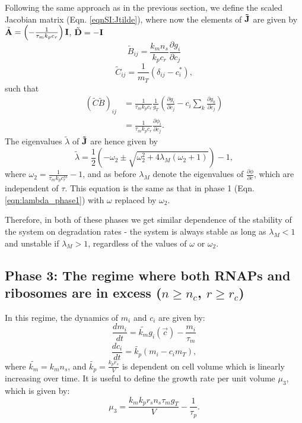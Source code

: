 \documentclass[10pt]{article}
\begin{document}
Following the same approach as in the previous section, we define the scaled Jacobian matrix (Eqn. \ref{eqnSI:Jtilde}), where now the elements of $\bf{\tilde{J}}$ are given by $\tilde{\textbf{A}} = \left(-\frac{1}{\tau_m k_p c_r}\right) \bf{I}$, $\tilde{\bf{D}} = -\mathbf{I}$
\begin{equation}
    \tilde{B}_{ij} = \frac{k_m n_s}{k_p c_r} \frac{\partial g_i}{\partial c_j}
\end{equation}
\begin{equation}
    \tilde{C}_{ij} = \frac{1}{m_T} (\delta_{ij} - c_i^*),
\end{equation}
such that
\begin{equation}
\begin{split}
    (\tilde{C}\tilde{B})_{ij} &= \frac{1}{\tau_m k_p c_r} \frac{1}{g_T} \left(\frac{\partial g_i}{\partial c_j} - c_i \sum_k \frac{\partial g_k}{\partial c_j} \right) \\
    &= \frac{1}{\tau_m k_p c_r} \frac{\partial \phi_i}{\partial c_j}.
\end{split}
\end{equation}
The eigenvalues $\tilde{\lambda}$ of $\bf{\tilde{J}}$ are hence given by 
\begin{equation}
    \tilde{\lambda} = \frac{1}{2}\left(-\omega_2 \pm \sqrt{\omega_2^2 + 4 \lambda_M (\omega_2+1)} \right) - 1,
    \label{eqn:lambda_phase2}
\end{equation}
where $\omega_2 = \frac{1}{\tau_m k_p c_r^{ss}} - 1$, and as before $\lambda_M$ denote the eigenvalues of $\frac{\partial \phi}{\partial c}$, which are independent of $\tau$. This equation is the same as that in phase 1 (Eqn. \ref{eqn:lambda_phase1}) with $\omega$ replaced by $\omega_2$. 

Therefore, in both of these phases we get similar dependence of the stability of the system on degradation rates - the system is always stable as long as $\lambda_M < 1$ and unstable if $\lambda_M > 1$, regardless of the values of $\omega$ or $\omega_2$.

\subsection*{Phase 3: The regime where both RNAPs and ribosomes are in excess ($n \geq n_c$, $r \geq r_c$)}

In this regime, the dynamics of $m_i$ and $c_i$ are given by:
\begin{equation}
    \frac{dm_i}{dt} = \tilde{k_m} g_i(\vec{c}) - \frac{m_i}{\tau_m}
\end{equation}
\begin{equation}
    \frac{dc_i}{dt} = \tilde{k_p} (m_i - c_i m_T), 
\end{equation}
where $\tilde{k_m} = k_m n_s$, and $\tilde{k_p} = \frac{k_p r_s}{V}$ is dependent on cell volume which is linearly increasing over time. It is useful to define the growth rate per unit volume $\mu_3$, which is given by:
\begin{equation}
    \mu_3 = \frac{k_m k_p r_s n_s \tau_m g_T}{V} - \frac{1}{\tau_p}.
    \label{eqn:mu3}
\end{equation}
\end{document}
